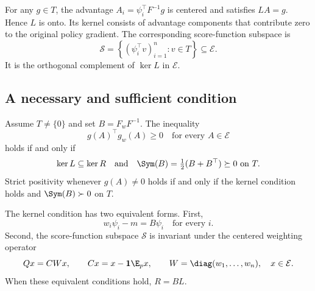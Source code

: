 For any $g\in T$, the advantage $A_i=\psi_i^\top F^{-1}g$ is centered and satisfies $LA=g$. Hence $L$ is onto. Its kernel consists of advantage components that contribute zero to the original policy gradient. The corresponding score-function subspace is
\[
\mathcal S=\left\{(\psi_i^\top v)_{i=1}^n:v\in T\right\}\subseteq\mathcal E.
\]
It is the orthogonal complement of $\ker L$ in $\mathcal E$.

\subsection{A necessary and sufficient condition}

\begin{theorem}
\label{thm:euclidean}
Assume $T\ne\{0\}$ and set $B=F_wF^{-1}$. The inequality
\begin{equation}
g(A)^\top g_w(A)\ge0\quad\text{for every }A\in\mathcal E
\label{eq:universal-alignment}
\end{equation}
holds if and only if
\begin{equation}
\ker L\subseteq\ker R
\quad\text{and}\quad
\Sym(B)=\tfrac12(B+B^\top)\succeq0\text{ on }T.
\label{eq:alignment-criterion}
\end{equation}
Strict positivity whenever $g(A)\ne0$ holds if and only if the kernel condition holds and $\Sym(B)\succ0$ on $T$.

The kernel condition has two equivalent forms. First,
\begin{equation}
w_i\psi_i-m=B\psi_i\quad\text{for every }i.
\label{eq:score-identity}
\end{equation}
Second, the score-function subspace $\mathcal S$ is invariant under the centered weighting operator
\[
Qx=CWx,\qquad Cx=x-\mathbf1\E_p x,\qquad W=\diag(w_1,\ldots,w_n),\quad x\in\mathcal E.
\]
When these equivalent conditions hold, $R=BL$.
\end{theorem}


